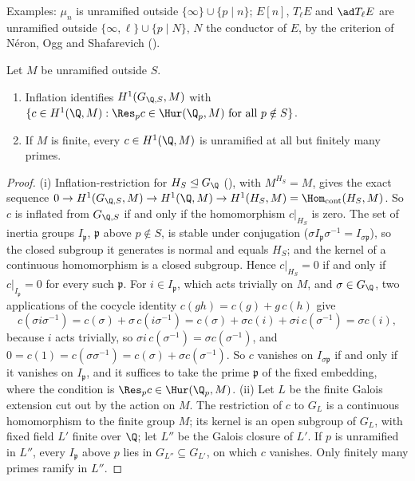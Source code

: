 \noindent Examples: $\mu_n$ is unramified outside $\{\infty\}\cup\{p\mid n\}$; $E[n]$, $T_\ell E$ and $\ad T_\ell E$ are unramified outside $\{\infty,\ell\}\cup\{p\mid N\}$, $N$ the
conductor of $E$, by the criterion of N\'eron, Ogg and Shafarevich ().

\begin{proposition}\label{prop:galcoh:unramified-almost-everywhere}
Let $M$ be unramified outside $S$.
\begin{enumerate}[label=(\roman*)]
\item Inflation identifies $H^1(G_{\Q,S},M)$ with $\{c\in H^1(\Q,M):\Res_pc\in\Hur(\Q_p,M)\text{ for all }p\notin S\}$.
\item If $M$ is finite, every $c\in H^1(\Q,M)$ is unramified at all but finitely many primes.
\end{enumerate}
\end{proposition}

\begin{proof}
(i) Inflation-restriction for $H_S\trianglelefteq G_\Q$ (), with $M^{H_S}=M$, gives the exact sequence
$0\to H^1(G_{\Q,S},M)\to H^1(\Q,M)\to H^1(H_S,M)=\Hom_{\mathrm{cont}}(H_S,M)$. So $c$ is inflated from $G_{\Q,S}$ if and only if the homomorphism $c|_{H_S}$ is zero. The set of
inertia groups $I_{\mathfrak p}$, $\mathfrak p$ above $p\notin S$, is stable under conjugation ($\sigma I_{\mathfrak p}\sigma^{-1}=I_{\sigma\mathfrak p}$), so the closed subgroup it generates is
normal and equals $H_S$; and the kernel of a continuous homomorphism is a closed subgroup. Hence $c|_{H_S}=0$ if and only if $c|_{I_{\mathfrak p}}=0$ for every such $\mathfrak p$.
For $i\in I_{\mathfrak p}$, which acts trivially on $M$, and $\sigma\in G_\Q$, two applications of the cocycle identity $c(gh)=c(g)+g\,c(h)$ give
\[
c(\sigma i\sigma^{-1})=c(\sigma)+\sigma\,c(i\sigma^{-1})=c(\sigma)+\sigma c(i)+\sigma i\,c(\sigma^{-1})=\sigma c(i),
\]
because $i$ acts trivially, so $\sigma i\,c(\sigma^{-1})=\sigma c(\sigma^{-1})$, and $0=c(1)=c(\sigma\sigma^{-1})=c(\sigma)+\sigma c(\sigma^{-1})$. So $c$ vanishes on $I_{\sigma\mathfrak p}$ if and only if it vanishes on $I_{\mathfrak p}$, and it suffices to take the
prime $\mathfrak p$ of the fixed embedding, where the condition is $\Res_pc\in\Hur(\Q_p,M)$.
(ii) Let $L$ be the finite Galois extension cut out by the action on $M$. The restriction of $c$ to $G_L$ is a continuous homomorphism to the finite group $M$; its kernel is
an open subgroup of $G_L$, with fixed field $L'$ finite over $\Q$; let $L''$ be the Galois closure of $L'$. If $p$ is unramified in $L''$, every $I_{\mathfrak p}$ above $p$
lies in $G_{L''}\subseteq G_{L'}$, on which $c$ vanishes. Only finitely many primes ramify in $L''$.
\end{proof}

